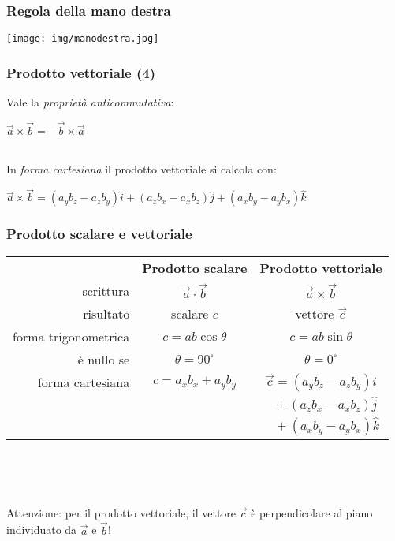 \documentclass[]{beamer}
\theoremstyle{plain}
\begin{document}
\begin{frame}
  \frametitle{Regola della mano destra}
  \texttt{[image: img/manodestra.jpg]}
\end{frame}



\begin{frame}
  \frametitle{Prodotto vettoriale (4)}
Vale la \emph{proprietà anticommutativa}:
\begin{center}
 $ \vec{a} \times \vec{b} = -\vec{b}\times\vec{a} $ 
\end{center}~\pause\\
In \emph{forma cartesiana} il prodotto vettoriale si calcola con:
\begin{center}
\colorbox{blue!30}{ $ \vec{a} \times \vec{b} = (a_y b_z - a_z b_y)\hat{i} + (a_z b_x -a_x b_z )\hat{j} + (a_x b_y - a_y b_x)\hat{k} $ }
\end{center}
\end{frame}


\begin{frame}
\frametitle{Prodotto scalare e vettoriale}

\begin{tabular}{rcc}
&\textbf{Prodotto scalare} & \textbf{Prodotto vettoriale} \\\rule{0pt}{4ex}
scrittura&$ \vec{a} \cdot \vec{b} $ & $ \vec{a}\times \vec{b} $ \\\rule{0pt}{3ex}
risultato&scalare $ c $ & vettore $ \vec{c} $ \\\rule{0pt}{3ex}
forma trigonometrica&$ c = ab\cos\theta $ & $ c = ab\sin\theta $ \\\rule{0pt}{4ex}
è nullo se&$ \theta = 90^\circ $ & $ \theta = 0^\circ $ \\\rule{0pt}{4ex}
forma cartesiana&$ c = a_x b_x + a_y b_y $ & $ \vec{c} = (a_y b_z - a_z b_y)\hat{i} $ \\\rule{0pt}{2ex}
&& $~~~ + (a_z b_x -a_x b_z )\hat{j} $ \\\rule{0pt}{2ex}
&&  $~~~~ + (a_x b_y - a_y b_x)\hat{k} $ \\
\end{tabular}

~

~

Attenzione: per il prodotto vettoriale, il vettore $ \vec{c} $ è perpendicolare al piano individuato da $ \vec{a} $ e $ \vec{b} $!
\end{frame}
\end{document}
